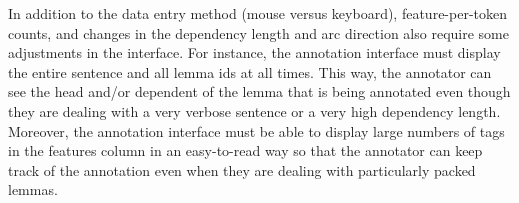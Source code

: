In addition to the data entry method (mouse versus keyboard), feature-per-token counts, and changes in the dependency length and arc direction also require some adjustments in the interface.
For instance, the annotation interface must display the entire sentence and all lemma ids at all times.
This way, the annotator can see the head and/or dependent of the lemma that is being annotated even though they are dealing with a very verbose sentence or a very high dependency length.
Moreover, the annotation interface must be able to display large numbers of tags in the features column in an easy-to-read way so that the annotator can keep track of the annotation even when they are dealing with particularly packed lemmas.










